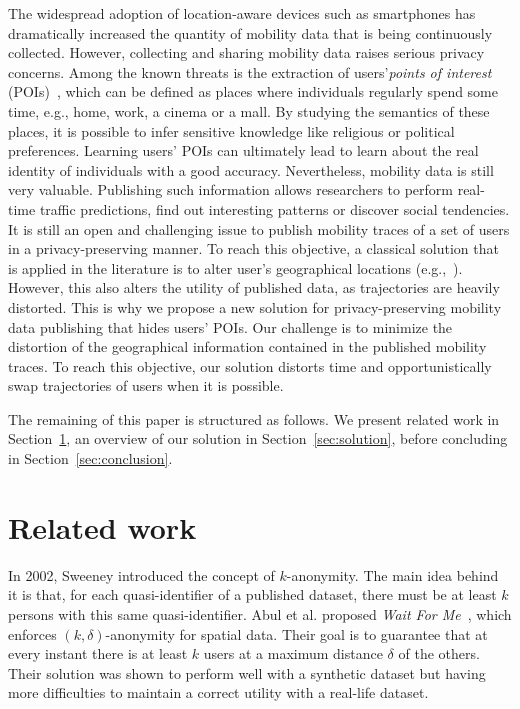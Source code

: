\documentclass[10,conference,compsocconf]{IEEEtran}
\begin{document}
The widespread adoption of location-aware devices such as smartphones has dramatically increased the quantity of mobility data that is being continuously collected.
However, collecting and sharing mobility data raises serious privacy concerns.
Among the known threats is the extraction of users'\textit{points of interest} (POIs)~\cite{Gambs11}, which can be defined as places where individuals regularly spend some time, e.g., home, work, a cinema or a mall.
By studying the semantics of these places, it is possible to infer sensitive knowledge like religious or political preferences.
Learning users' POIs can ultimately lead to learn about the real identity of individuals with a good accuracy.
Nevertheless, mobility data is still very valuable.
Publishing such information allows researchers to perform real-time traffic predictions, find out interesting patterns or discover social tendencies.
It is still an open and challenging issue to publish mobility traces of a set of users in a privacy-preserving manner.
To reach this objective, a classical solution that is applied in the literature is to alter user's geographical locations (e.g.,~\cite{Andres13,Abul10}).
However, this also alters the utility of published data, as trajectories are heavily distorted.
This is why we propose a new solution for privacy-preserving mobility data publishing that hides users' POIs.
Our challenge is to minimize the distortion of the geographical information contained in the published mobility traces.
To reach this objective, our solution distorts time and opportunistically swap trajectories of users when it is possible.


The remaining of this paper is structured as follows. We present related work in Section~\ref{sec:related}, an overview of our solution in Section~\ref{sec:solution}, before concluding in Section~\ref{sec:conclusion}.
 \section{Related work}
\label{sec:related}

In 2002, Sweeney introduced the concept of $k$-anonymity.
The main idea behind it is that, for each quasi-identifier of a published dataset, there must be at least $k$ persons with this same quasi-identifier.
Abul et al. proposed \textit{Wait For Me}~\cite{Abul10}, which enforces $(k,\delta)$-anonymity for spatial data.
Their goal is to guarantee that at every instant there is at least $k$ users at a maximum distance $\delta$ of the others.
Their solution was shown to perform well with a synthetic dataset but having more difficulties to maintain a correct utility with a real-life dataset.
\end{document}
